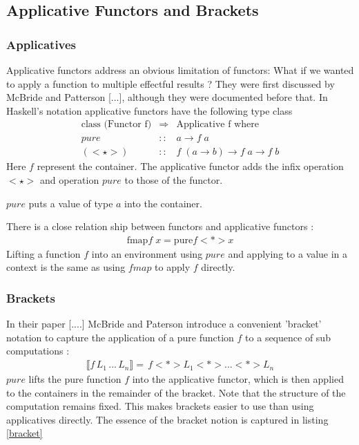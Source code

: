 \documentclass[12pt,fleqn]{article}
\begin{document}
%
%
%
%
\subsection{Applicative Functors and Brackets}
%
%
%
%
\subsubsection{Applicatives}
\label{subsubsec:applicatives}
%
%
%
Applicative functors address an obvious limitation of functors: What if we wanted to apply a function to multiple effectful results ?
They were first discussed by McBride and Patterson [...], although they were documented before that.
In Haskell's notation applicative functors have the following type class 
\begin{eqnarray*}
\mbox{class (Functor f)} &\Rightarrow& \mbox{Applicative f where} \\
pure  &::& a \rightarrow f\;a \\
(<\star>) &::& f \; ( a \rightarrow b) \rightarrow f \; a \rightarrow f\;b
\end{eqnarray*}
Here $f$ represent the container. 
The applicative functor adds the infix operation $<\star>$ and operation $pure$ to those of the functor.

$pure$ puts a value of type $a$ into the container.

There is a close relation ship between functors and applicative functors :
\begin{eqnarray*}
  \mbox{fmap} f \; x = \mbox{pure} f <*> x
\end{eqnarray*} 
Lifting a function $f$ into an environment using $pure$ and applying to a value in a context is the same as using $fmap$ to apply $f$ directly.

%
%
%
\subsubsection{Brackets}
%
%

In their paper [....] McBride and Paterson introduce a convenient 'bracket' notation to capture the application of a pure function $f$ 
to a sequence of sub computations :
\begin{eqnarray*}
 \llbracket f\, L_{1}\, ...\, L_{n} \rrbracket  =  \, f <*> L_{1} <*>...<*> L_{n}
\end{eqnarray*}
$pure$ lifts the pure function $f$ into the applicative functor, which is then applied to the containers in the remainder of the bracket. 
Note that the structure of the computation remains fixed.
This makes brackets easier to use than using applicatives directly.
The essence of the bracket notion is captured in listing \ref{bracket}
\end{document}
